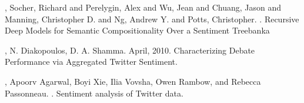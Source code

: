 %
%

\newpage
\begin{thebibliography}{}

%
%
%
%


,
Socher, Richard  and  Perelygin, Alex  and  Wu, Jean  and  Chuang, Jason  and  Manning, Christopher D.  and  Ng, Andrew Y.  and  Potts, Christopher. 
. 
\newblock Recursive Deep Models for Semantic Compositionality Over a Sentiment Treebanka

,
N. Diakopoulos, D. A. Shamma. 
\newblock April, 2010.
\newblock Characterizing Debate Performance via Aggregated Twitter Sentiment.

,
Apoorv Agarwal, Boyi Xie, Ilia Vovsha, Owen Rambow, and Rebecca Passonneau. 
. 
\newblock Sentiment analysis of Twitter data. 


\end{thebibliography}
